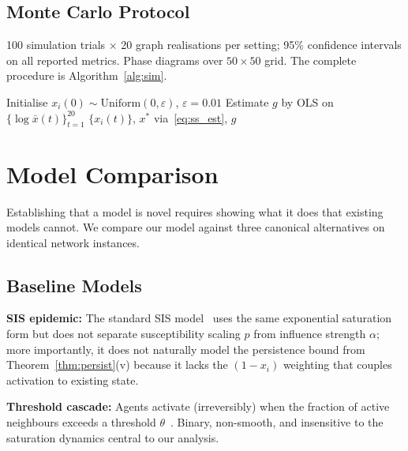 \documentclass[10pt,twocolumn]{article}
\theoremstyle{myproof}
\newcommand{\xst}{x^*}
\begin{document}
\subsection{Monte Carlo Protocol}
100 simulation trials $\times$ 20 graph realisations per setting; 95\% confidence intervals on
all reported metrics. Phase diagrams over $50\times 50$ grid. The complete procedure is
Algorithm~\ref{alg:sim}.

\begin{algorithm}
\small\caption{Nonlinear Influence--Recovery Simulation}
\label{alg:sim}
Initialise $x_i(0)\sim\mathrm{Uniform}(0,\varepsilon)$, $\varepsilon=0.01$\;
Estimate $g$ by OLS on $\{\log\bar{x}(t)\}_{t=1}^{20}$\;
\Return $\{x_i(t)\}$, $\xst$ via~\eqref{eq:ss_est}, $g$
\end{algorithm}

\section{Model Comparison}
\label{sec:comparison}

Establishing that a model is novel requires showing what it does that existing models cannot. We
compare our model against three canonical alternatives on identical network instances.

\subsection{Baseline Models}
\textbf{SIS epidemic:} The standard SIS model~\cite{pastor2001,vanmieghem2009} uses the same
exponential saturation form but does not separate susceptibility scaling $p$ from influence
strength $\alpha$; more importantly, it does not naturally model the persistence bound from
Theorem~\ref{thm:persist}(v) because it lacks the $(1-x_i)$ weighting that couples activation
to existing state.

\textbf{Threshold cascade:} Agents activate (irreversibly) when the fraction of active neighbours
exceeds a threshold $\theta$~\cite{granovetter1978,watts2002}. Binary, non-smooth, and
insensitive to the saturation dynamics central to our analysis.
\end{document}
